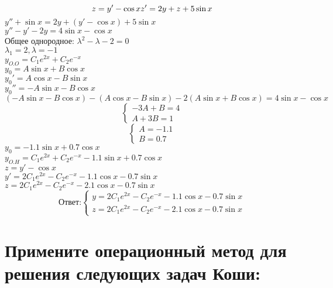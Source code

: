 \documentclass{article}
\begin{document}
    \begin{equation*}
        z = y' - \cos x\\
        z' = 2y + z + 5 \sin x
    \end{equation*}
    $y'' + \sin x = 2y + (y' - \cos x) + 5 \sin x$\\
    $y'' - y' -2y = 4 \sin x - \cos x$\\
    Общее однородное: $\lambda^2 - \lambda -2 = 0$\\
    $\lambda_1 = 2, \lambda = -1$\\
    $y_{O.O} = C_1 e^{2x} + C_2 e^{-x}$\\
    $y_{0} = A \sin x + B \cos x$\\
    $y_{0}' = A \cos x - B \sin x$\\
    $y_{0}'' = - A \sin x - B \cos x$\\
    $(-A \sin x - B \cos x) - (A \cos x - B \sin x) - 2 (A \sin x + B \cos x) = 4 \sin x - \cos x$\\
    \begin{equation*}
        \begin{cases}
            -3A + B = 4\\
            A + 3B = 1
        \end{cases}
    \end{equation*}
    \begin{equation*}
        \begin{cases}
            A = -1.1\\
            B = 0.7
        \end{cases}
    \end{equation*}
    $y_{0} = - 1.1 \sin x + 0.7 \cos x$\\
    $y_{O.H} = C_1 e^{2x} + C_2 e^{-x} - 1.1 \sin x + 0.7 \cos x$\\
    $z = y' - \cos x$\\
    $y' = 2C_1 e^{2x} - C_2 e^{-x} - 1.1 \cos x - 0.7 \sin x$\\
    $z = 2C_1 e^{2x} - C_2 e^{-x} - 2.1 \cos x - 0.7 \sin x$
    \begin{equation*}
        \text{Ответ:}
        \begin{cases}
            y = 2C_1 e^{2x} - C_2 e^{-x} - 1.1 \cos x - 0.7 \sin x\\
            z = 2C_1 e^{2x} - C_2 e^{-x} - 2.1 \cos x - 0.7 \sin x
        \end{cases}
    \end{equation*}


\newpage
    \section{Примените операционный метод для решения следующих задач Коши:}
\end{document}
